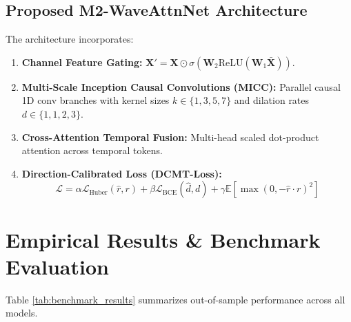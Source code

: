 \documentclass[journal]{IEEEtran}
\begin{document}
\subsection{Proposed M2-WaveAttnNet Architecture}
The architecture incorporates:
\begin{enumerate}
    \item \textbf{Channel Feature Gating:} $\mathbf{X}' = \mathbf{X} \odot \sigma(\mathbf{W}_2 \text{ReLU}(\mathbf{W}_1 \bar{\mathbf{X}}))$.
    \item \textbf{Multi-Scale Inception Causal Convolutions (MICC):} Parallel causal 1D conv branches with kernel sizes $k \in \{1, 3, 5, 7\}$ and dilation rates $d \in \{1, 1, 2, 3\}$.
    \item \textbf{Cross-Attention Temporal Fusion:} Multi-head scaled dot-product attention across temporal tokens.
    \item \textbf{Direction-Calibrated Loss (DCMT-Loss):}
    \begin{equation}
    \mathcal{L} = \alpha \mathcal{L}_{\text{Huber}}(\hat{r}, r) + \beta \mathcal{L}_{\text{BCE}}(\hat{d}, d) + \gamma \mathbb{E}\left[\max(0, -\hat{r} \cdot r)^2\right]
    \end{equation}
\end{enumerate}

\section{Empirical Results \& Benchmark Evaluation}
Table \ref{tab:benchmark_results} summarizes out-of-sample performance across all models.
\end{document}

